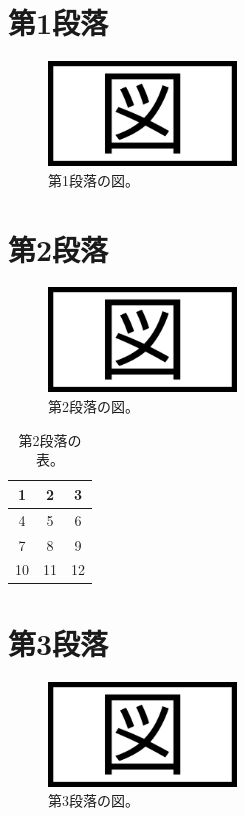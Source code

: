 \documentclass[a4paper, platex, dvipdfmx]{jsarticle}
\begin{document}
\section{第1段落}
\lipsum[1]

\begin{figure}[H]
  \centering
  \includegraphics[width=5cm]{sample.png}
  \caption{第1段落の図。}
\end{figure}

\section{第2段落}
\lipsum[2]

\begin{figure}[H]
  \centering
  \includegraphics[width=5cm]{sample.png}
  \caption{第2段落の図。}
\end{figure}

\begin{table}[H]
  \centering
  \caption{第2段落の表。}
  \begin{tabular}{ccc}
    \hline
    1 & 2 & 3 \\\hline
    4 & 5 & 6\\
    7 & 8 & 9 \\
    10 & 11 & 12 \\\hline
  \end{tabular}
\end{table}

\section{第3段落}
\lipsum[3]

\begin{figure}[H]
  \centering
  \includegraphics[width=5cm]{sample.png}
  \caption{第3段落の図。}
\end{figure}
\end{document}
